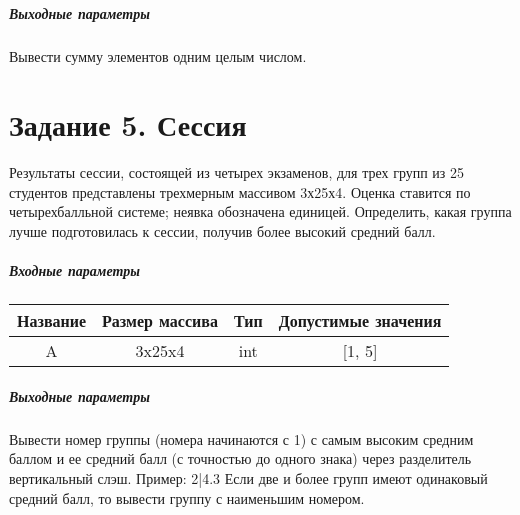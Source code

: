 \paragraph{Выходные параметры}

Вывести сумму элементов одним целым числом.
\\
\chapter*{Задание 5. Сессия}

Результаты сессии, состоящей из четырех экзаменов, для трех групп из 25 студентов представлены трехмерным массивом 3х25х4. Оценка ставится по четырехбалльной системе; неявка обозначена единицей. Определить, какая группа лучше подготовилась к сессии, получив более высокий средний балл.

\paragraph{Входные параметры}

\begin{tabular}{ |c|c|c|c| }
\hline
Название & Размер массива & Тип & Допустимые значения \\ 
 \hline
A & 3x25x4 & int & [1, 5] \\ 
 \hline

\end{tabular}


\paragraph{Выходные параметры}

Вывести номер группы (номера начинаются с 1) с самым высоким средним баллом и ее средний балл (с точностью до одного знака) через разделитель вертикальный слэш. Пример: 2|4.3
Если две и более групп имеют одинаковый средний балл, то вывести группу с наименьшим номером.
\\
